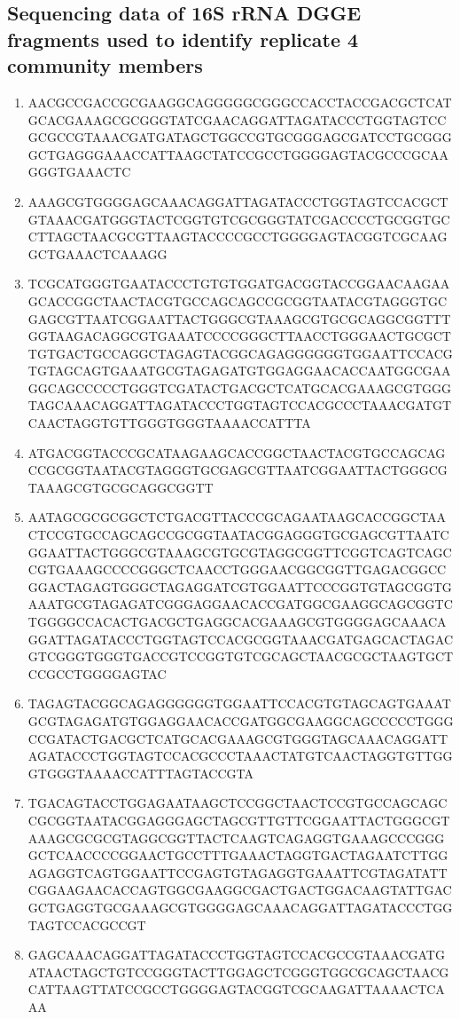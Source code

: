 \documentclass[11pt]{article}
\begin{document}
\subsection{Sequencing data of 16S rRNA DGGE fragments used to identify replicate 4 community members}
\begin{enumerate}
\item AACGCCGACCGCGAAGGCAGGGGGCGGGCCACCTACCGACGCTCATGCACGAAAGCGCGGGTATCGAACAGGATTAGATACCCTGGTAGTCCGCGCCGTAAACGATGATAGCTGGCCGTGCGGGAGCGATCCTGCGGGGCTGAGGGAAACCATTAAGCTATCCGCCTGGGGAGTACGCCCGCAAGGGTGAAACTC
\item AAAGCGTGGGGAGCAAACAGGATTAGATACCCTGGTAGTCCACGCTGTAAACGATGGGTACTCGGTGTCGCGGGTATCGACCCCTGCGGTGCCTTAGCTAACGCGTTAAGTACCCCGCCTGGGGAGTACGGTCGCAAGGCTGAAACTCAAAGG
\item TCGCATGGGTGAATACCCTGTGTGGATGACGGTACCGGAACAAGAAGCACCGGCTAACTACGTGCCAGCAGCCGCGGTAATACGTAGGGTGCGAGCGTTAATCGGAATTACTGGGCGTAAAGCGTGCGCAGGCGGTTTGGTAAGACAGGCGTGAAATCCCCGGGCTTAACCTGGGAACTGCGCTTGTGACTGCCAGGCTAGAGTACGGCAGAGGGGGGTGGAATTCCACGTGTAGCAGTGAAATGCGTAGAGATGTGGAGGAACACCAATGGCGAAGGCAGCCCCCTGGGTCGATACTGACGCTCATGCACGAAAGCGTGGGTAGCAAACAGGATTAGATACCCTGGTAGTCCACGCCCTAAACGATGTCAACTAGGTGTTGGGTGGGTAAAACCATTTA
\item ATGACGGTACCCGCATAAGAAGCACCGGCTAACTACGTGCCAGCAGCCGCGGTAATACGTAGGGTGCGAGCGTTAATCGGAATTACTGGGCGTAAAGCGTGCGCAGGCGGTT
\item AATAGCGCGCGGCTCTGACGTTACCCGCAGAATAAGCACCGGCTAACTCCGTGCCAGCAGCCGCGGTAATACGGAGGGTGCGAGCGTTAATCGGAATTACTGGGCGTAAAGCGTGCGTAGGCGGTTCGGTCAGTCAGCCGTGAAAGCCCCGGGCTCAACCTGGGAACGGCGGTTGAGACGGCCGGACTAGAGTGGGCTAGAGGATCGTGGAATTCCCGGTGTAGCGGTGAAATGCGTAGAGATCGGGAGGAACACCGATGGCGAAGGCAGCGGTCTGGGGCCACACTGACGCTGAGGCACGAAAGCGTGGGGAGCAAACAGGATTAGATACCCTGGTAGTCCACGCGGTAAACGATGAGCACTAGACGTCGGGTGGGTGACCGTCCGGTGTCGCAGCTAACGCGCTAAGTGCTCCGCCTGGGGAGTAC
\item TAGAGTACGGCAGAGGGGGGTGGAATTCCACGTGTAGCAGTGAAATGCGTAGAGATGTGGAGGAACACCGATGGCGAAGGCAGCCCCCTGGGCCGATACTGACGCTCATGCACGAAAGCGTGGGTAGCAAACAGGATTAGATACCCTGGTAGTCCACGCCCTAAACTATGTCAACTAGGTGTTGGGTGGGTAAAACCATTTAGTACCGTA
\item TGACAGTACCTGGAGAATAAGCTCCGGCTAACTCCGTGCCAGCAGCCGCGGTAATACGGAGGGAGCTAGCGTTGTTCGGAATTACTGGGCGTAAAGCGCGCGTAGGCGGTTACTCAAGTCAGAGGTGAAAGCCCGGGGCTCAACCCCGGAACTGCCTTTGAAACTAGGTGACTAGAATCTTGGAGAGGTCAGTGGAATTCCGAGTGTAGAGGTGAAATTCGTAGATATTCGGAAGAACACCAGTGGCGAAGGCGACTGACTGGACAAGTATTGACGCTGAGGTGCGAAAGCGTGGGGAGCAAACAGGATTAGATACCCTGGTAGTCCACGCCGT
\item GAGCAAACAGGATTAGATACCCTGGTAGTCCACGCCGTAAACGATGATAACTAGCTGTCCGGGTACTTGGAGCTCGGGTGGCGCAGCTAACGCATTAAGTTATCCGCCTGGGGAGTACGGTCGCAAGATTAAAACTCAAA

\end{enumerate}
\end{document}
